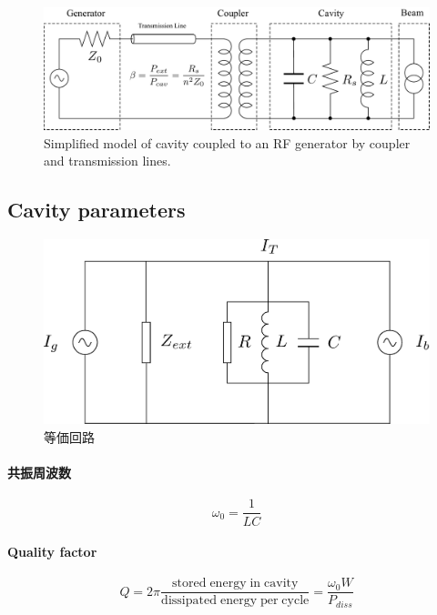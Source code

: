 \documentclass[book]{jlreq}
\begin{document}
\begin{figure}[hbt]
    \begin{center}
        \includegraphics[width=\linewidth]{figs/Cavity_Model.pdf}
        \caption{Simplified model of cavity coupled to an RF generator by coupler and transmission lines.}
        \label{Cavity_Model}
    \end{center}
\end{figure}

\subsection{Cavity parameters}

\begin{figure}[hbt]
    \begin{center}
        \includegraphics[width=\linewidth]{figs/Equivalent_Circuit}
        \caption{等価回路}
        \label{Equivalent_Circuit}
    \end{center}
\end{figure}
%
\paragraph{共振周波数}
%
\begin{equation}
    \omega_0 = \frac{1}{L C}
\end{equation}
%
\paragraph{Quality factor}
%
\begin{equation}
    Q = 2\pi \frac{\mathrm{stored\;energy\;in\;cavity}}{\mathrm{dissipated \; energy\;per\;cycle}} = \frac{\omega_0 W}{P_{diss}}
\end{equation}
%
\end{document}
